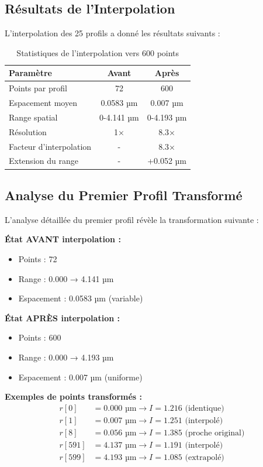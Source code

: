 \documentclass[twocolumn,10pt]{article}
\begin{document}
\subsection{Résultats de l'Interpolation}

L'interpolation des 25 profils a donné les résultats suivants :

\begin{table}[H]
\centering
\caption{Statistiques de l'interpolation vers 600 points}
\begin{tabular}{|l|c|c|}
\hline
\textbf{Paramètre} & \textbf{Avant} & \textbf{Après} \\
\hline
Points par profil & 72 & 600 \\
Espacement moyen & 0.0583 µm & 0.007 µm \\
Range spatial & 0-4.141 µm & 0-4.193 µm \\
Résolution & 1× & 8.3× \\
Facteur d'interpolation & - & 8.3× \\
Extension du range & - & +0.052 µm \\
\hline
\end{tabular}
\end{table}

\subsection{Analyse du Premier Profil Transformé}

L'analyse détaillée du premier profil révèle la transformation suivante :

\textbf{État AVANT interpolation :}
\begin{itemize}
\item Points : 72
\item Range : 0.000 → 4.141 µm
\item Espacement : 0.0583 µm (variable)
\end{itemize}

\textbf{État APRÈS interpolation :}
\begin{itemize}
\item Points : 600
\item Range : 0.000 → 4.193 µm
\item Espacement : 0.007 µm (uniforme)
\end{itemize}

\textbf{Exemples de points transformés :}
\begin{equation}
\begin{aligned}
r[0] &= 0.000 \text{ µm} \rightarrow I = 1.216 \text{ (identique)} \\
r[1] &= 0.007 \text{ µm} \rightarrow I = 1.251 \text{ (interpolé)} \\
r[8] &= 0.056 \text{ µm} \rightarrow I = 1.385 \text{ (proche original)} \\
r[591] &= 4.137 \text{ µm} \rightarrow I = 1.191 \text{ (interpolé)} \\
r[599] &= 4.193 \text{ µm} \rightarrow I = 1.085 \text{ (extrapolé)}
\end{aligned}
\end{equation}
\end{document}
